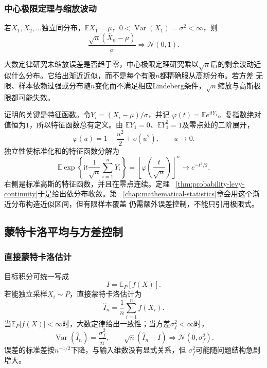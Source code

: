 \subsubsection{中心极限定理与缩放波动}

\begin{theorem}
\label{thm:probability-iid-central-limit}
若\(X_1,X_2,\ldots\)独立同分布，\(\mathbb{E}X_1=\mu\)，\(0<\operatorname{Var}(X_1)=\sigma^2<\infty\)，则
\[ \frac{\sqrt{n}(\overline{X}_n-\mu)}{\sigma}
  \Rightarrow\mathcal{N}(0,1). \]
\end{theorem}

大数定律研究未缩放误差是否趋于零，中心极限定理研究乘以\(\sqrt{n}\)后的剩余波动近似什么分布。它给出渐近近似，而不是每个有限\(n\)都精确服从高斯分布。若方差
无限、样本依赖过强或分布随\(n\)变化而不满足相应Lindeberg条件，\(\sqrt{n}\)缩放与高斯极限都可能失效。

证明的关键是特征函数。令\(Y_i=(X_i-\mu)/\sigma\)，并记
\(\varphi(t)=\mathbb{E}e^{\mathrm{i}tY_1}\)。复指数绝对值恒为\(1\)，所以特征函数总有定义。由
\(\mathbb{E}Y_1=0\)、\(\mathbb{E}Y_1^2=1\)及零点处的二阶展开，
\[
  \varphi(u)=1-\frac{u^2}{2}+o(u^2),
  \qquad u\to0.
\]
独立性使标准化和的特征函数分解为
\[
  \mathbb{E}\exp\left\{
    \mathrm{i}t\frac{1}{\sqrt n}\sum_{i=1}^{n}Y_i
  \right\}
  =
  \left[\varphi\left(\frac{t}{\sqrt n}\right)\right]^n
  \longrightarrow e^{-t^2/2}.
\]
右侧是标准高斯的特征函数，并且在零点连续。定理
~\ref{thm:probability-levy-continuity}于是给出依分布收敛。第
~\ref{chap:mathematical-statistics}章会用这个渐近分布构造近似区间，但有限样本覆盖
仍需额外误差控制，不能只引用极限式。

\subsection{蒙特卡洛平均与方差控制}
\label{sec:probability-monte-carlo-variance-reduction}

\subsubsection{直接蒙特卡洛估计}

目标积分可统一写成
\[ I=\mathbb{E}_P[f(X)]. \]
若能独立采样\(X_i\sim P\)，直接蒙特卡洛估计为
\[ \widehat{I}_n
  =\frac{1}{n}\sum_{i=1}^{n}f(X_i). \]
当\(\mathbb{E}_P|f(X)|<\infty\)时，大数定律给出一致性；当方差\(\sigma_f^2<\infty\)时，
\[ \operatorname{Var}(\widehat{I}_n)=\frac{\sigma_f^2}{n},
  \qquad\sqrt{n}(\widehat{I}_n-I)\Rightarrow\mathcal{N}(0,\sigma_f^2). \]
误差的标准差按\(n^{-1/2}\)下降，与输入维数没有显式关系，但
\(\sigma_f^2\)可能随问题结构急剧增大。

